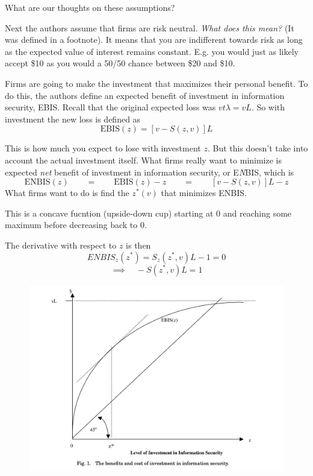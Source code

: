 \documentclass[11pt]{article}
\begin{document}
What are our thoughts on these assumptions?

Next the authors assume that firms are risk neutral. {\it What does this mean?} (It was defined in a footnote). It means that you are indifferent towards risk as long as the expected value of interest remains constant. E.g. you would just as likely accept \$10 as you would a 50/50 chance between \$20 and \$10.

Firms are going to make the investment that maximizes their personal benefit. To do this, the authors define an expected benefit of investment in information security, EBIS. Recall that the original expected loss was $v t \lambda = v L$. So with investment the new loss is defined as 
$$ \text{EBIS}(z) = [v - S(z,v)]L$$

This is how much you expect to lose with investment $z$. But this doesn't take into account the actual investment itself. What firms really want to minimize is expected \textit{net} benefit of investment in information security, or E\textit{N}BIS, which is 
$$\text{ENBIS}(z) \qquad = \qquad \text{EBIS}(z) - z \qquad=\qquad [v - S(z,v)]L - z$$
What firms want to do is find the $z^*(v)$ that minimizes ENBIS.

This is a concave fucntion (upside-down cup) starting at 0 and reaching some maximum before decreasing back to 0. 

The derivative with respect to $z$ is then 
$$ ENBIS_z(z^*) = S_z(z^*,v)L - 1 = 0$$
$$ \implies \quad -S(z^*,v)L = 1$$

\begin{figure}[h]
    \centering
    \includegraphics*[width=4.5in]{fig1.png}
    \label{fig:fig1}
\end{figure}
\FloatBarrier
\end{document}
